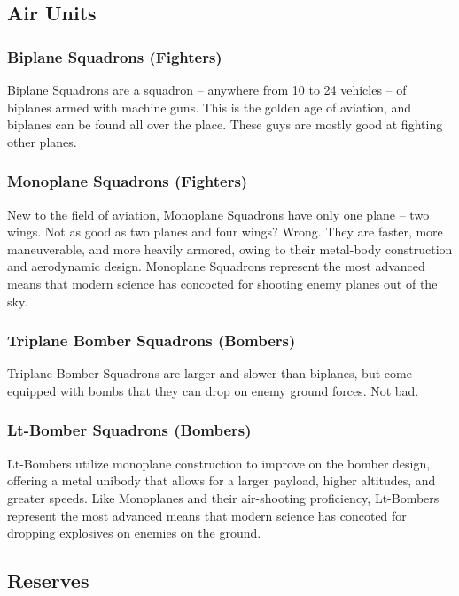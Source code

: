 \documentclass[11 pt]{scrartcl}
\begin{document}
\subsection*{Air Units}

\subsubsection*{Biplane Squadrons (Fighters)}

Biplane Squadrons are a squadron -- anywhere from 10 to 24 vehicles -- of biplanes armed with machine guns. This is the golden age of aviation, and biplanes can be found all over the place. These guys are mostly good at fighting other planes.

\subsubsection*{Monoplane Squadrons (Fighters)}

New to the field of aviation, Monoplane Squadrons have only one plane -- two wings. Not as good as two planes and four wings? Wrong. They are faster, more maneuverable, and more heavily armored, owing to their metal-body construction and aerodynamic design. Monoplane Squadrons represent the most advanced means that modern science has concocted for shooting enemy planes out of the sky.

\subsubsection*{Triplane Bomber Squadrons (Bombers)}

Triplane Bomber Squadrons are larger and slower than biplanes, but come equipped with bombs that they can drop on enemy ground forces. Not bad.

\subsubsection*{Lt-Bomber Squadrons (Bombers)}

Lt-Bombers utilize monoplane construction to improve on the bomber design, offering a metal unibody that allows for a larger payload, higher altitudes, and greater speeds. Like Monoplanes and their air-shooting proficiency, Lt-Bombers represent the most advanced means that modern science has concoted for dropping explosives on enemies on the ground.

\subsection{Reserves}
\end{document}
